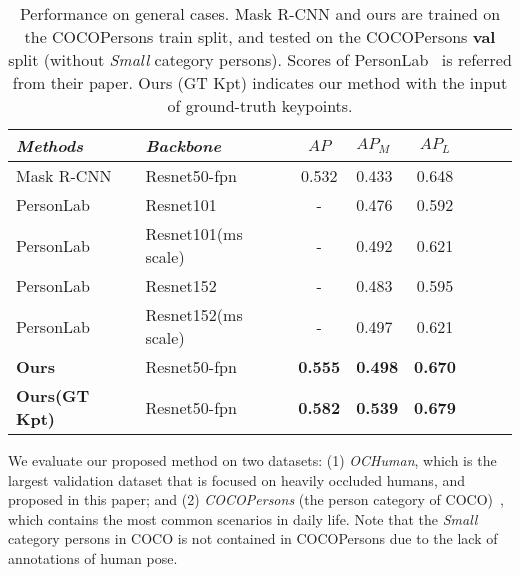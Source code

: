 \documentclass[10pt,twocolumn,letterpaper]{article}
\begin{document}
\setlength{\tabcolsep}{4pt}
\begin{table}
\small
\begin{center}
\begin{tabular}{llclclcl}
\toprule[1.5pt]
\emph{Methods} & \emph{Backbone} & $AP$ & $AP_M$ & $AP_L$ \\
\hline\noalign{\smallskip}
Mask R-CNN & Resnet50-fpn & 0.532 & 0.433 & 0.648\\
PersonLab & Resnet101 & - & 0.476 & 0.592\\
PersonLab & Resnet101(ms scale) & - & 0.492 & 0.621\\
PersonLab & Resnet152 & - & 0.483 & 0.595\\
PersonLab & Resnet152(ms scale) & -  & 0.497 & 0.621\\
\midrule[1pt]
\textbf{Ours} & Resnet50-fpn  & \textbf{0.555} & \bf{0.498} & \bf{0.670}\\
\textbf{Ours(GT Kpt)} & Resnet50-fpn  & \textbf{0.582}  & \bf{0.539} & \bf{0.679}\\
\bottomrule[1.5pt]
\end{tabular}
\end{center}
\setlength{\abovecaptionskip}{-0.1cm}
\setlength{\belowcaptionskip}{-0.5cm}
\caption{Performance on general cases. Mask R-CNN and ours are trained on the COCOPersons train split, and tested on the COCOPersons \textbf{val} split (without \emph{Small} category persons). Scores of PersonLab~\cite{papandreou2018personlab} is referred from their paper. Ours (GT Kpt) indicates our method with the input of ground-truth keypoints.}
\label{table:score_general}
\end{table}
\setlength{\tabcolsep}{1.4pt}

We evaluate our proposed method on two datasets: (1) \emph{OCHuman}, which is the largest validation dataset that is focused on heavily occluded humans, and proposed in this paper; and (2) \emph{COCOPersons} (the person category of COCO)~\cite{lin2014microsoft}, which contains the most common scenarios in daily life. Note that the \emph{Small} category persons in COCO is not contained in COCOPersons due to the lack of annotations of human pose. 
\end{document}
